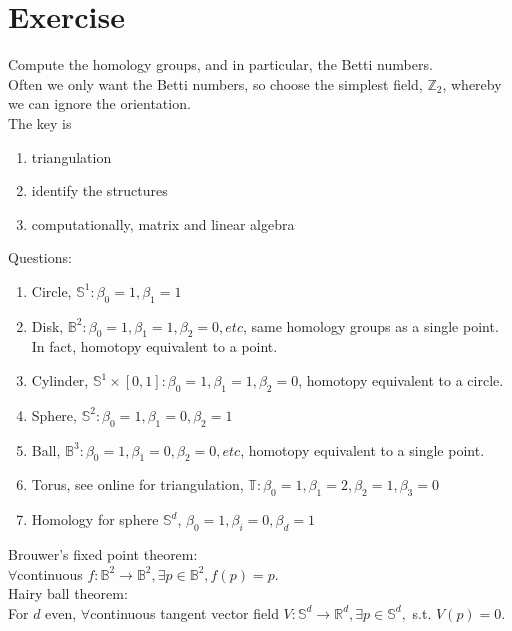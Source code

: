 \documentclass[10pt,a4paper]{report}
\begin{document}
\section{Exercise}
Compute the homology groups, and in particular, the Betti numbers.\\
Often we only want the Betti numbers, so choose the simplest field, $\mathbb{Z}_2$, whereby we can ignore the orientation.\\
The key is
\begin{enumerate}
	\item triangulation
	\item identify the structures
	\item computationally, matrix and linear algebra
\end{enumerate}
Questions:
\begin{enumerate}
	\item Circle, $\mathbb{S}^1:\beta_0=1,\beta_1=1$
	\item Disk, $\mathbb{B}^2:\beta_0=1,\beta_1=1,\beta_2=0,etc$, same homology groups as a single point. In fact, homotopy equivalent to a point.
	\item Cylinder, $\mathbb{S}^1\times [0,1]:\beta_0=1,\beta_1=1,\beta_2=0$, homotopy equivalent to a circle.
	\item Sphere, $\mathbb{S}^2:\beta_0=1,\beta_1=0,\beta_2=1$
	\item Ball, $\mathbb{B}^3:\beta_0=1,\beta_1=0,\beta_2=0,etc$, homotopy equivalent to a single point.
	\item Torus, see online for triangulation, $\mathbb{T}:\beta_0=1,\beta_1=2,\beta_2=1,\beta_3=0$
	\item Homology for sphere $\mathbb{S}^d$, $\beta_0=1,\beta_i=0,\beta_d=1$
\end{enumerate}
Brouwer's fixed point theorem:\\
$\forall$continuous $f:\mathbb{B}^2\to\mathbb{B}^2,\exists p\in\mathbb{B}^2,f(p)=p$.\\
Hairy ball theorem:\\
For $d$ even, $\forall$continuous tangent vector field $V:\mathbb{S}^d\to\mathbb{R}^d,\exists p\in\mathbb{S}^d,$ s.t. $V(p)=0$.\\
\end{document}
